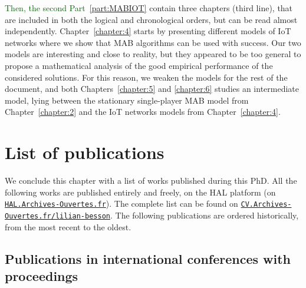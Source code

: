 \textcolor{darkgreen}{Then, the second Part~\ref{part:MABIOT}} contain three chapters (third line), that are included in both the logical and chronological orders, but can be read almost independently.
Chapter~\ref{chapter:4} starts by presenting different models of IoT networks where we show that MAB algorithms can be used with success. Our two models are interesting and close to reality, but they appeared to be too general to propose a mathematical analysis of the good empirical performance of the considered solutions.
For this reason, we weaken the models for the rest of the document,
and both Chapters~\ref{chapter:5} and \ref{chapter:6} studies an intermediate model, lying between the stationary single-player MAB model from Chapter~\ref{chapter:2} and the IoT networks models from Chapter~\ref{chapter:4}.




\section{List of publications}
\label{sec:1:listPublications}


We conclude this chapter with a list of works published during this PhD.
All the following works are published entirely and freely, on the HAL platform (on \href{https://hal.archives-ouvertes.fr/}{\texttt{HAL.Archives-Ouvertes.fr}}).
The complete list can be found on
\href{https://cv.archives-ouvertes.fr/lilian-besson/}{\texttt{CV.Archives-Ouvertes.fr/lilian-besson}}.
%
The following publications are ordered historically, from the most recent to the oldest.


\subsection*{Publications in international conferences with proceedings}

